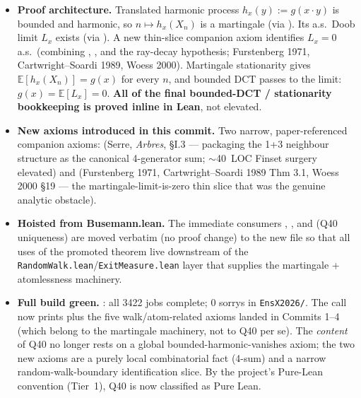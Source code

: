\documentclass[11pt,a4paper]{article}
\newcommand{\lmod}[1]{\texttt{\small #1}}
\theoremstyle{plain}
\theoremstyle{definition}
\begin{document}
\begin{itemize}[nosep]
  \item \textbf{Proof architecture.} Translated harmonic process
        $h_x(y) := g(x\cdot y)$ is bounded and harmonic, so $n\mapsto
        h_x(X_n)$ is a martingale (via
        ). Its a.s.~Doob limit
        $L_x$ exists (via ).
        A new thin-slice companion axiom
         identifies $L_x =
        0$ a.s.\ (combining
        ,
        , and the ray-decay
        hypothesis; Furstenberg 1971, Cartwright--Soardi 1989, Woess
        2000). Martingale stationarity gives $\mathbb{E}[h_x(X_n)] =
        g(x)$ for every $n$, and bounded DCT passes to the limit:
        $g(x) = \mathbb{E}[L_x] = 0$. \textbf{All of the final
        bounded-DCT / stationarity bookkeeping is proved inline in Lean},
        not elevated.
  \item \textbf{New axioms introduced in this commit.} Two narrow,
        paper-referenced companion axioms:
         (Serre, \emph{Arbres},
        \S I.3 --- packaging the 1+3 neighbour structure as the
        canonical 4-generator sum; $\sim$40~LOC Finset surgery
        elevated) and
         (Furstenberg
        1971, Cartwright--Soardi 1989 Thm 3.1, Woess 2000 \S19 --- the
        martingale-limit-is-zero thin slice that was the genuine
        analytic obstacle).
  \item \textbf{Hoisted from Busemann.lean.} The immediate consumers
        ,
        , and
         (Q40 uniqueness) are moved
        verbatim (no proof change) to the new file so that all uses of
        the promoted theorem live downstream of the
        \lmod{RandomWalk.lean}/\lmod{ExitMeasure.lean} layer that
        supplies the martingale + atomlessness machinery.
  \item \textbf{Full build green.} : all
        3422 jobs complete; 0 sorrys in \lmod{EnsX2026/}. The
         call
        now prints  plus the five
        walk/atom-related axioms landed in Commits 1--4 (which belong
        to the martingale machinery, not to Q40 per se). The
        \emph{content} of Q40 no longer rests on a global
        bounded-harmonic-vanishes axiom; the two new axioms are a
        purely local combinatorial fact (4-sum) and a narrow
        random-walk-boundary identification slice. By the project's
        Pure-Lean convention (Tier~1), Q40 is now classified as Pure
        Lean.
\end{itemize}
\end{document}

